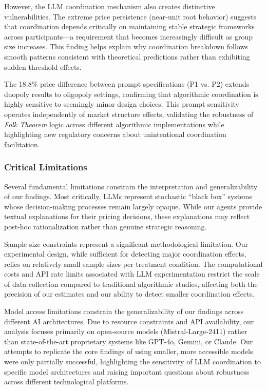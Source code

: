 However, the LLM coordination mechanism also creates distinctive vulnerabilities. The extreme price persistence (near-unit root behavior) suggests that coordination depends critically on maintaining stable strategic frameworks across participants—a requirement that becomes increasingly difficult as group size increases. This finding helps explain why coordination breakdown follows smooth patterns consistent with theoretical predictions rather than exhibiting sudden threshold effects.

The 18.8\% price difference between prompt specifications (P1 vs. P2) extends \textcite{fish_algorithmic_2025} duopoly results to oligopoly settings, confirming that algorithmic coordination is highly sensitive to seemingly minor design choices. This prompt sensitivity operates independently of market structure effects, validating the robustness of \emph{Folk Theorem} logic across different algorithmic implementations while highlighting new regulatory concerns about unintentional coordination facilitation.

\subsubsection*{Critical Limitations}

Several fundamental limitations constrain the interpretation and generalizability of our findings. Most critically, LLMs represent stochastic \enquote{black box} systems whose decision-making processes remain largely opaque. While our agents provide textual explanations for their pricing decisions, these explanations may reflect post-hoc rationalization rather than genuine strategic reasoning.

Sample size constraints represent a significant methodological limitation. Our experimental design, while sufficient for detecting major coordination effects, relies on relatively small sample sizes per treatment condition. The computational costs and API rate limits associated with LLM experimentation restrict the scale of data collection compared to traditional algorithmic studies, affecting both the precision of our estimates and our ability to detect smaller coordination effects.

Model access limitations constrain the generalizability of our findings across different AI architectures. Due to resource constraints and API availability, our analysis focuses primarily on open-source models (Mistral-Large-2411) rather than state-of-the-art proprietary systems like GPT-4o, Gemini, or Claude. Our attempts to replicate the core findings of \textcite{fish_algorithmic_2025} using smaller, more accessible models were only partially successful, highlighting the sensitivity of LLM coordination to specific model architectures and raising important questions about robustness across different technological platforms.

